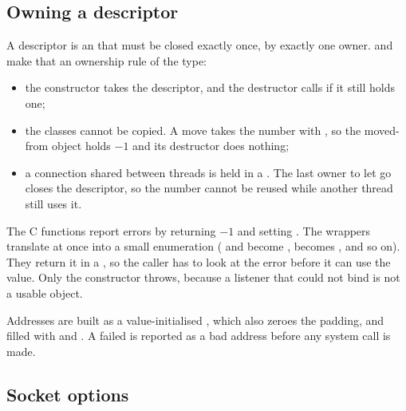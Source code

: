 \subsection{Owning a descriptor}

A descriptor is an  that must be closed exactly once, by exactly one
owner.  and  make that an ownership rule of
the type:
\begin{itemize}
  \item the constructor takes the descriptor, and the destructor calls
         if it still holds one;
  \item the classes cannot be copied. A move takes the number with
        , so the moved-from object holds $-1$
        and its destructor does nothing;
  \item a connection shared between threads is held in a
        . The last owner to let go closes the
        descriptor, so the number cannot be reused while another thread still uses
        it.
\end{itemize}

The C functions report errors by returning $-1$ and setting . The
wrappers translate  at once into a small  enumeration
( and  become , 
becomes , and so on). They return it in a
, so the caller has to look at the error before it can use the
value. Only the  constructor throws, because a listener that
could not bind is not a usable object.

Addresses are built as a value-initialised , which also
zeroes the  padding, and filled with  and
. A failed  is reported as a bad address before
any system call is made.

\subsection{Socket options}

